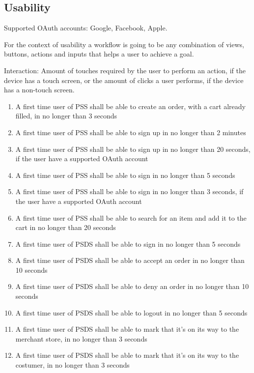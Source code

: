 \subsection{Usability}
Supported OAuth accounts: Google, Facebook, Apple.
 
For the context of usability a workflow is going to be any combination of 
views, buttons, actions and inputs that helps a user to achieve a goal.

Interaction: Amount of touches required by the user to perform an action, if 
the device has a touch screen, or the amount of clicks a user performs, if the
device has a non-touch screen.

\begin{enumerate}[label=SEC-\arabic*]
    \item A first time user of PSS shall be able to create an order, with a 
    cart already filled, in no longer than 3 seconds
    \item A first time user of PSS shall be able to sign up in no longer 
    than 2 minutes
    \item A first time user of PSS shall be able to sign up in no longer 
    than 20 seconds, if the user have a supported OAuth account
    \item A first time user of PSS shall be able to sign in no longer 
    than 5 seconds
    \item A first time user of PSS shall be able to sign in no longer 
    than 3 seconds, if the user have a supported OAuth account
    \item A first time user of PSS shall be able to search for an item and 
    add it to the cart in no longer than 20 seconds
    \item A first time user of PSDS shall be able to sign in no longer 
    than 5 seconds
    \item A first time user of PSDS shall be able to accept an order in no 
    longer than 10 seconds
    \item A first time user of PSDS shall be able to deny an order in no 
    longer than 10 seconds
    \item A first time user of PSDS shall be able to logout in no longer 
    than 5 seconds
    \item A first time user of PSDS shall be able to mark that it’s on its 
    way to the merchant store, in no longer than 3 seconds
    \item A first time user of PSDS shall be able to mark that it’s on its 
    way to the costumer, in no longer than 3 seconds

\end{enumerate}
